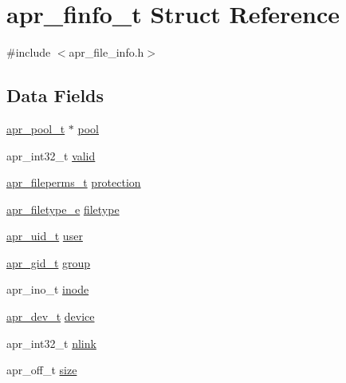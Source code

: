 \hypertarget{structapr__finfo__t}{\section{apr\-\_\-finfo\-\_\-t Struct Reference}
\label{structapr__finfo__t}
}


{\ttfamily \#include $<$apr\-\_\-file\-\_\-info.\-h$>$}

\subsection*{Data Fields}
\begin{DoxyCompactItemize}
\item 
\hyperlink{group__apr__pools_gaf137f28edcf9a086cd6bc36c20d7cdfb}{apr\-\_\-pool\-\_\-t} $\ast$ \hyperlink{structapr__finfo__t_a71496f86b5489c87e58e9c03fe468fb8}{pool}
\item 
apr\-\_\-int32\-\_\-t \hyperlink{structapr__finfo__t_aff0cdf06637edec63c4701e582792019}{valid}
\item 
\hyperlink{group__apr__file__info_ga3af19c4c47007169064a70f9351bc7d8}{apr\-\_\-fileperms\-\_\-t} \hyperlink{structapr__finfo__t_a7c09d73ad1957e2c0e6c6b77d94e90ab}{protection}
\item 
\hyperlink{group__apr__file__info_gae3f0ce3014337a52b39852f8bf81ca7c}{apr\-\_\-filetype\-\_\-e} \hyperlink{structapr__finfo__t_a274ae0dd60b59182c2e0134bc9a09a20}{filetype}
\item 
\hyperlink{group__apr__user_gad1aa508f584bc230acf4f68ba4fc4de7}{apr\-\_\-uid\-\_\-t} \hyperlink{structapr__finfo__t_ab79d14bd50f50662d29ad433166c4bc5}{user}
\item 
\hyperlink{group__apr__user_ga22e9e224e984f837f3e276833e2f3a55}{apr\-\_\-gid\-\_\-t} \hyperlink{structapr__finfo__t_a15c9c056330308de4dafb3826a9b02bc}{group}
\item 
apr\-\_\-ino\-\_\-t \hyperlink{structapr__finfo__t_a73aebb666ddc391d53a871802c27eed6}{inode}
\item 
\hyperlink{group__apr__file__info_gae2c25c4b679613081599f776efa96c4a}{apr\-\_\-dev\-\_\-t} \hyperlink{structapr__finfo__t_a38cbfbff641284065481f5907d59c8bf}{device}
\item 
apr\-\_\-int32\-\_\-t \hyperlink{structapr__finfo__t_a98598f28735d75aa0c1994efc825e6d9}{nlink}
\item 
apr\-\_\-off\-\_\-t \hyperlink{structapr__finfo__t_a3e47a673c5b82a25a783a732dee6f946}{size}
\item 

\end{DoxyCompactItemize}
